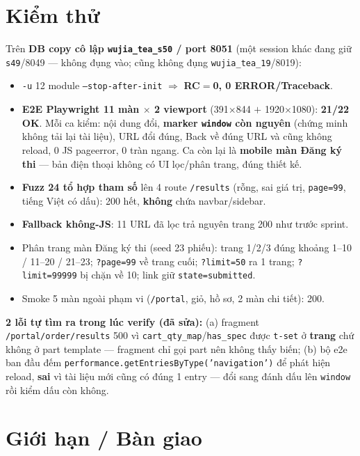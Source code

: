 \section{Kiểm thử}

Trên \textbf{DB copy cô lập \texttt{wujia\_tea\_s50} / port 8051} (một session khác đang giữ
\texttt{s49}/8049 --- không đụng vào; cũng không đụng \texttt{wujia\_tea\_19}/8019):

\begin{itemize}
  \item \texttt{-u} 12 module \texttt{--stop-after-init} $\Rightarrow$ \textbf{RC$=$0, 0 ERROR/Traceback}.
  \item \textbf{E2E Playwright 11 màn $\times$ 2 viewport} (391$\times$844 $+$ 1920$\times$1080):
    \textbf{21/22 OK}. Mỗi ca kiểm: nội dung đổi, \textbf{marker \texttt{window} còn nguyên}
    (chứng minh không tải lại tài liệu), URL đổi đúng, Back về đúng URL và cũng không reload,
    0 JS pageerror, 0 tràn ngang. Ca còn lại là \textbf{mobile màn Đăng ký thi} --- bản điện
    thoại không có UI lọc/phân trang, đúng thiết kế.
  \item \textbf{Fuzz 24 tổ hợp tham số} lên 4 route \texttt{/results} (rỗng, sai giá trị,
    \texttt{page=99}, tiếng Việt có dấu): 200 hết, \textbf{không} chứa navbar/sidebar.
  \item \textbf{Fallback không-JS}: 11 URL đã lọc trả nguyên trang 200 như trước sprint.
  \item Phân trang màn Đăng ký thi (seed 23 phiếu): trang 1/2/3 đúng khoảng
    1--10 / 11--20 / 21--23; \texttt{?page=99} về trang cuối; \texttt{?limit=50} ra 1 trang;
    \texttt{?limit=99999} bị chặn về 10; link giữ \texttt{state=submitted}.
  \item Smoke 5 màn ngoài phạm vi (\texttt{/portal}, giỏ, hồ sơ, 2 màn chi tiết): 200.
\end{itemize}

\textbf{2 lỗi tự tìm ra trong lúc verify (đã sửa):} (a) fragment
\texttt{/portal/order/results} 500 vì \texttt{cart\_qty\_map}/\texttt{has\_spec} được
\texttt{t-set} ở \textbf{trang} chứ không ở part template --- fragment chỉ gọi part nên không
thấy biến; (b) bộ e2e ban đầu đếm \texttt{performance.getEntriesByType('navigation')} để phát
hiện reload, \textbf{sai} vì tài liệu mới cũng có đúng 1 entry --- đổi sang đánh dấu lên
\texttt{window} rồi kiểm dấu còn không.

\section{Giới hạn / Bàn giao}

